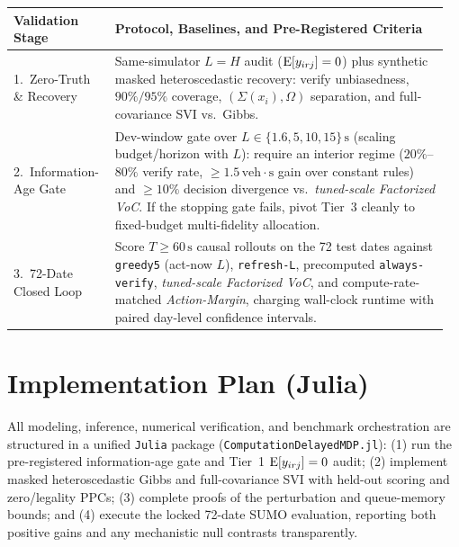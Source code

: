 \begin{center}
\vspace{-2pt}
{\footnotesize\renewcommand{\arraystretch}{1.07}
\begin{tabular}{@{}p{0.22\linewidth}p{0.74\linewidth}@{}}
\toprule
\textbf{Validation Stage} & \textbf{Protocol, Baselines, and Pre-Registered Criteria}\\
\midrule
1.\ Zero-Truth \& Recovery & Same-simulator $L=H$ audit ($\operatorname{E}[y_{irj}]=0$) plus synthetic masked heteroscedastic recovery: verify unbiasedness, $90\%/95\%$ coverage, $(\Sigma(x_i),\Omega)$ separation, and full-covariance SVI vs.\ Gibbs.\\
2.\ Information-Age Gate & Dev-window gate over $L \in \{1.6, 5, 10, 15\}\,\mathrm{s}$ (scaling budget/horizon with $L$): require an interior regime ($20\%$--$80\%$ verify rate, $\ge 1.5\,\mathrm{veh{\cdot}s}$ gain over constant rules) and $\ge 10\%$ decision divergence vs.\ \emph{tuned-scale Factorized VoC}. If the stopping gate fails, pivot Tier~3 cleanly to fixed-budget multi-fidelity allocation.\\
3.\ 72-Date Closed Loop & Score $T \ge 60\,\mathrm{s}$ causal rollouts on the 72 test dates against \texttt{greedy5} (act-now $L$), \texttt{refresh-L}, precomputed \texttt{always-verify}, \emph{tuned-scale Factorized VoC}, and compute-rate-matched \emph{Action-Margin}, charging wall-clock runtime with paired day-level confidence intervals.\\
\bottomrule
\end{tabular}}
\vspace{-2pt}
\end{center}

\section{Implementation Plan (Julia)}

All modeling, inference, numerical verification, and benchmark orchestration are structured in a unified \texttt{Julia} package (\texttt{ComputationDelayedMDP.jl}): (1) run the pre-registered information-age gate and Tier~1 $\operatorname{E}[y_{irj}]=0$ audit; (2) implement masked heteroscedastic Gibbs and full-covariance SVI with held-out scoring and zero/legality PPCs; (3) complete proofs of the perturbation and queue-memory bounds; and (4) execute the locked 72-date SUMO evaluation, reporting both positive gains and any mechanistic null contrasts transparently.

